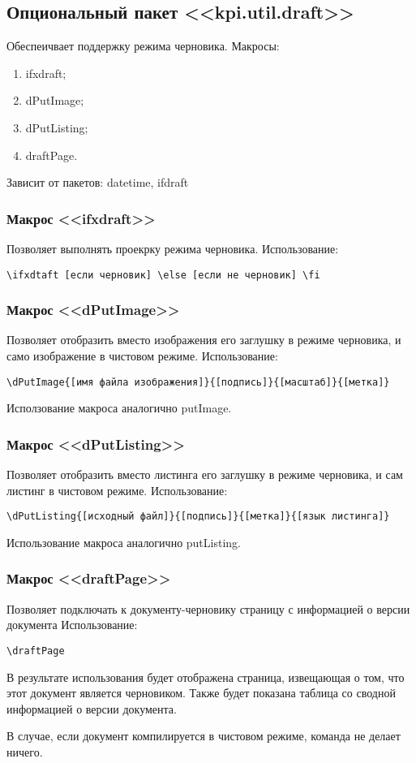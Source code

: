 \subsection{Опциональный пакет <<kpi.util.draft>>}
Обеспеичвает поддержку режима черновика.
Макросы:
\begin{enumerate}
\item ifxdraft;
\item dPutImage;
\item dPutListing;
\item draftPage.
\end{enumerate}
Зависит от пакетов: datetime, ifdraft 

\subsubsection{Макрос <<ifxdraft>>}
Позволяет выполнять проекрку режима черновика.
Использование:{\small
\begin{Verbatim}
\ifxdtaft [если черновик] \else [если не черновик] \fi
\end{Verbatim}}
\normalsize

\subsubsection{Макрос <<dPutImage>>}
Позволяет отобразить вместо изображения его заглушку в режиме черновика, и само изображение в чистовом режиме.
Использование:{\small
\begin{Verbatim}
\dPutImage{[имя файла изображения]}{[подпись]}{[масштаб]}{[метка]}
\end{Verbatim}}
\normalsize
Исползование макроса аналогично putImage.

\subsubsection{Макрос <<dPutListing>>}
Позволяет отобразить вместо листинга его заглушку в режиме черновика, и сам листинг в чистовом режиме.
Использование:{\small
\begin{Verbatim}
\dPutListing{[исходный файл]}{[подпись]}{[метка]}{[язык листинга]}
\end{Verbatim}}
\normalsize
Использование макроса аналогично putListing.

\subsubsection{Макрос <<draftPage>>}
Позволяет подключать к документу-черновику страницу с информацией о версии документа
Использование:{\small
\begin{Verbatim}
\draftPage
\end{Verbatim}}
\normalsize
В результате использования будет отображена страница, извещающая о том, что этот документ является черновиком. Также будет показана таблица со сводной информацией о версии документа.\par
В случае, если документ компилируется в чистовом режиме, команда не делает ничего.